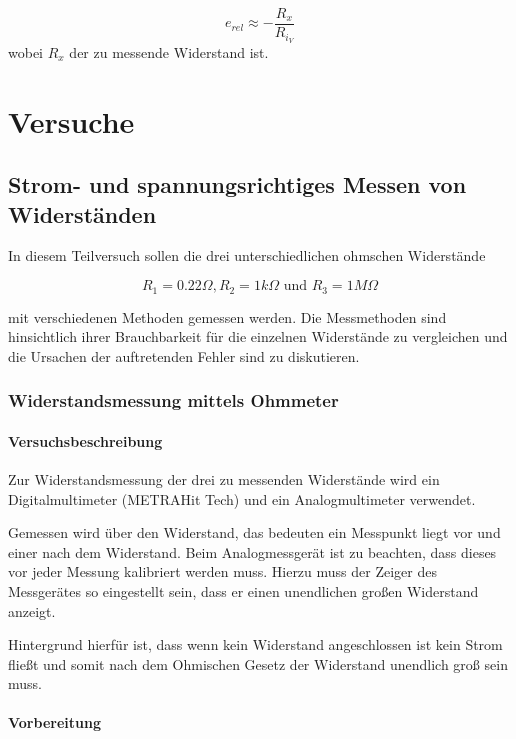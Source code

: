 \documentclass[a4paper, 11pt]{report}
\renewcommand{\chaptername}{Versuch}
\begin{document}
\[
e_{rel} \approx -\frac{R_x}{R_{i_V}}
\]
wobei \(R_x\) der zu messende Widerstand ist.




\renewcommand{\chaptername}{Versuch}
\newpage
{}
\part{Versuche}

\chapter[Widerstandsmessung]{Strom- und spannungsrichtiges Messen von Widerständen}

In diesem Teilversuch sollen die drei unterschiedlichen ohmschen Widerstände

\[
R_1 = 0.22 \Omega, R_2 = 1k \Omega \text{ und } R_3 = 1M \Omega
\]

mit verschiedenen Methoden gemessen werden. Die Messmethoden sind hinsichtlich ihrer Brauchbarkeit für die einzelnen Widerstände zu vergleichen und die Ursachen der auftretenden Fehler sind zu diskutieren.

\section[Ohmmeter]{Widerstandsmessung mittels Ohmmeter}
\subsection{Versuchsbeschreibung}

Zur Widerstandsmessung der drei zu messenden Widerstände wird ein Digitalmultimeter (METRAHit Tech) und ein Analogmultimeter verwendet.

Gemessen wird über den Widerstand, das bedeuten ein Messpunkt liegt vor und einer nach dem Widerstand. Beim Analogmessgerät ist zu beachten, dass dieses vor jeder Messung kalibriert werden muss. Hierzu muss der Zeiger des Messgerätes so eingestellt sein, dass er einen unendlichen großen Widerstand anzeigt.

Hintergrund hierfür ist, dass wenn kein Widerstand angeschlossen ist kein Strom fließt und somit nach dem Ohmischen Gesetz der Widerstand unendlich groß sein muss.

\subsection{Vorbereitung}
\end{document}
